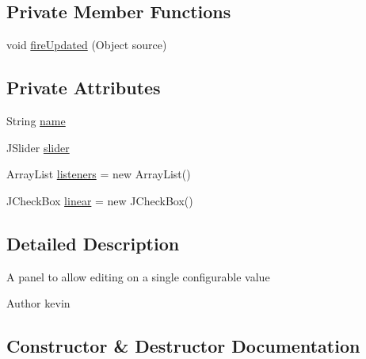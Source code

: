\subsection*{Private Member Functions}
\begin{DoxyCompactItemize}
\item 
void \mbox{\hyperlink{classorg_1_1newdawn_1_1slick_1_1tools_1_1peditor_1_1_value_panel_a26186da0cc3082d426c54cc7cc94aefe}{fire\+Updated}} (Object source)
\end{DoxyCompactItemize}
\subsection*{Private Attributes}
\begin{DoxyCompactItemize}
\item 
String \mbox{\hyperlink{classorg_1_1newdawn_1_1slick_1_1tools_1_1peditor_1_1_value_panel_ac3f651b9e3f21c979dc9f3c7df17da3a}{name}}
\item 
J\+Slider \mbox{\hyperlink{classorg_1_1newdawn_1_1slick_1_1tools_1_1peditor_1_1_value_panel_a7b5cc531a99541b95b43875ab0e9766f}{slider}}
\item 
Array\+List \mbox{\hyperlink{classorg_1_1newdawn_1_1slick_1_1tools_1_1peditor_1_1_value_panel_ae8be70f5fbf496c47f1b1c5cb9e3c1fa}{listeners}} = new Array\+List()
\item 
J\+Check\+Box \mbox{\hyperlink{classorg_1_1newdawn_1_1slick_1_1tools_1_1peditor_1_1_value_panel_accd8a5d5872a9fe38b1e546944982dfd}{linear}} = new J\+Check\+Box()
\end{DoxyCompactItemize}


\subsection{Detailed Description}
A panel to allow editing on a single configurable value

\begin{DoxyAuthor}{Author}
kevin 
\end{DoxyAuthor}


\subsection{Constructor \& Destructor Documentation}
\mbox{\label{classorg_1_1newdawn_1_1slick_1_1tools_1_1peditor_1_1_value_panel_ab24f7bd43b07cf5ee555dc768b340974}} 
